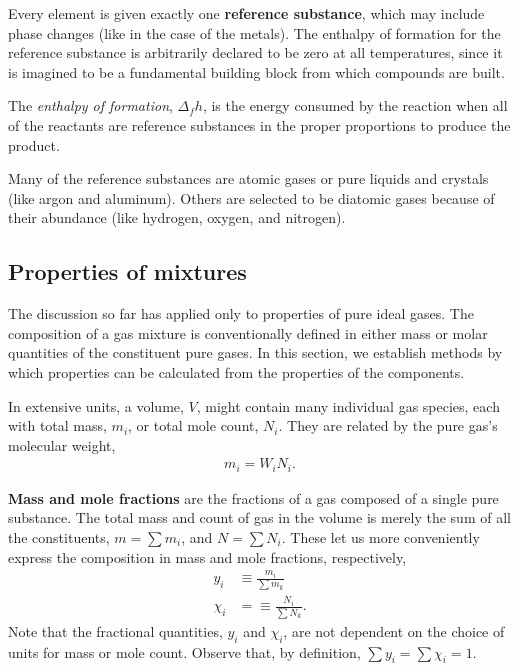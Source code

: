 Every element is given exactly one {\bf reference substance}, which may include phase changes (like in the case of the metals).  The enthalpy of formation for the reference substance is arbitrarily declared to be zero at all temperatures, since it is imagined to be a fundamental building block from which compounds are built.

The \emph{enthalpy of formation}, $\Delta_f h$, is the energy consumed by the reaction when all of the reactants are reference substances in the proper proportions to produce the product.

Many of the reference substances are atomic gases or pure liquids and crystals (like argon and aluminum).  Others are selected to be diatomic gases because of their abundance (like hydrogen, oxygen, and nitrogen).

\subsection{Properties of mixtures}\label{sec:ig:mix}

The discussion so far has applied only to properties of pure ideal gases.  The composition of a gas mixture is conventionally defined in either mass or molar quantities of the constituent pure gases.  In this section, we establish methods by which properties can be calculated from the properties of the components.  

In extensive units, a volume, $V$, might contain many individual gas species, each with total mass, $m_i$, or total mole count, $N_i$.  They are related by the pure gas's molecular weight,
\begin{align}
m_i = W_i N_i.
\end{align}

{\bf Mass and mole fractions} are the fractions of a gas composed of a single pure substance. The total mass and count of gas in the volume is merely the sum of all the constituents, $m = \sum m_i$, and $N = \sum N_i$.  These let us more conveniently express the composition in mass and mole fractions, respectively,
\begin{subequations}
\begin{align}
y_i &\equiv \frac{m_i}{\sum m_k}\\
\chi_i &= \equiv \frac{N_i}{\sum N_k}.
\end{align}
\end{subequations}
Note that the fractional quantities, $y_i$ and $\chi_i$, are not dependent on the choice of units for mass or mole count.  Observe that, by definition, $\sum y_i = \sum \chi_i = 1$.

